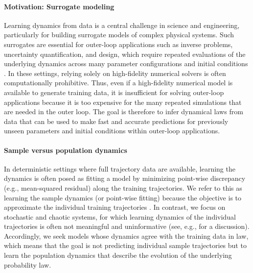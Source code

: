 \documentclass{article}
\theoremstyle{definition}
\theoremstyle{plain}
\theoremstyle{definition}
\theoremstyle{remark}
\begin{document}
\paragraph{Motivation: Surrogate modeling} Learning dynamics from data is a central challenge in science and engineering, particularly for building surrogate models of complex physical systems. Such surrogates are essential for outer-loop applications such as inverse problems, uncertainty quantification, and design, which require repeated evaluations of the underlying dynamics across many parameter configurations and initial conditions \cite{PWG17MultiSurvey}. In these settings, relying solely on high-fidelity numerical solvers is often computationally prohibitive. Thus, even if a high-fidelity numerical model is available to generate training data, it is insufficient for solving outer-loop applications because it is too expensive for the many repeated simulations that are needed in the outer loop. The goal is therefore to infer dynamical laws from data that can be used to make fast and accurate predictions for previously unseen parameters and initial conditions within outer-loop applications.

\paragraph{Sample versus population dynamics} In deterministic settings where full trajectory data are available, learning the dynamics is often posed as fitting a model by minimizing point-wise discrepancy (e.g., mean-squared residual) along the training trajectories. We refer to this as learning the sample dynamics (or point-wise fitting) because the objective is to approximate the individual training trajectories \cite{li2021fourierneuraloperatorparametric,Lu2021,KOVACHKI2024419}. In contrast, we focus on stochastic and chaotic systems, for which learning dynamics of the individual trajectories is often not meaningful and uninformative (see, e.g., \citet{neklyudov_action_2023,blickhan2025dicediscreteinversecontinuity} for a discussion). Accordingly, we seek models whose dynamics agree with the training data in law, which means that the goal is not predicting individual sample trajectories but to learn the population dynamics that describe the evolution of the underlying probability law. 
\end{document}

